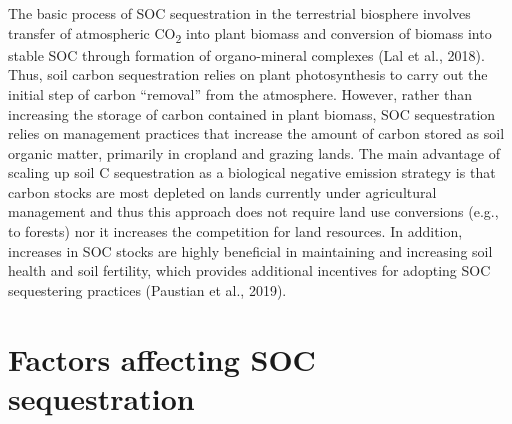 \documentclass[
  10pt,
  b5paper,
]{book}
\begin{document}
The basic process of SOC sequestration in the terrestrial biosphere involves transfer of atmospheric CO\textsubscript{2} into plant biomass and conversion of biomass into stable SOC through formation of organo-mineral complexes (Lal et al., 2018). Thus, soil carbon sequestration relies on plant photosynthesis to carry out the initial step of carbon ``removal'' from the atmosphere. However, rather than increasing the storage of carbon contained in plant biomass, SOC sequestration relies on management practices that increase the amount of carbon stored as soil organic matter, primarily in cropland and grazing lands. The main advantage of scaling up soil C sequestration as a biological negative emission strategy is that carbon stocks are most depleted on lands currently under agricultural management and thus this approach does not require land use conversions (e.g., to forests) nor it increases the competition for land resources. In addition, increases in SOC stocks are highly beneficial in maintaining and increasing soil health and soil fertility, which provides additional incentives for adopting SOC sequestering practices (Paustian et al., 2019).

\hypertarget{factors-affecting-soc-sequestration}{%
\section{Factors affecting SOC sequestration}\label{factors-affecting-soc-sequestration}}
\end{document}
